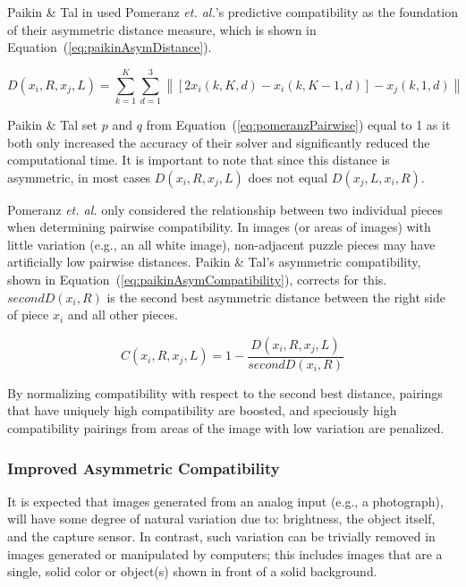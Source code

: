 \documentclass{report}
\def\eref#1{(\ref{#1})}
\newcommand{\norm}[1]{\left\lVert#1\right\rVert}
\begin{document}
Paikin \& Tal in \cite{paikin2015} used Pomeranz \textit{et. al.}'s predictive compatibility as the foundation of their asymmetric distance measure, which is shown in Equation~\eref{eq:paikinAsymDistance}.

\begin{equation} \label{eq:paikinAsymDistance}
D(x_i,R,x_j,L) = \sum_{k=1}^{K}\sum_{d=1}^{3} \norm{[2x_i(k, K, d) - x_i(k, K-1, d)] - x_j(k, 1, d)}
\end{equation}

Paikin \& Tal set $p$ and $q$ from Equation~\eref{eq:pomeranzPairwise} equal to 1 as it both only increased the accuracy of their solver and significantly reduced the computational time.  It is important to note that since this distance is asymmetric, in most cases $D(x_i,R,x_j,L)$ does not equal $D(x_j,L,x_i,R)$.

Pomeranz \textit{et. al.} only considered the relationship between two individual pieces when determining pairwise compatibility.  In images (or areas of images) with little variation (e.g., an all white image), non-adjacent puzzle pieces may have artificially low pairwise distances.  Paikin \& Tal's asymmetric compatibility, shown in Equation~\eref{eq:paikinAsymCompatibility}, corrects for this.  $secondD(x_i,R)$ is the second best asymmetric distance between the right side of piece $x_i$ and all other pieces. 

\begin{equation} \label{eq:paikinAsymCompatibility}
C(x_i,R,x_j,L) = 1 - \frac{D(x_i,R,x_j,L)}{secondD(x_i,R)}
\end{equation}

\noindent
By normalizing compatibility with respect to the second best distance, pairings that have uniquely high compatibility are boosted, and speciously high compatibility pairings from areas of the image with low variation are penalized.

\subsubsection{Improved Asymmetric Compatibility}\label{sec:hammoudehPairwiseAffinity}

It is expected that images generated from an analog input (e.g., a photograph), will have some degree of natural variation due to: brightness, the object itself, and the capture sensor.  In contrast, such variation can be trivially removed in images generated or manipulated by computers; this includes images that are a single, solid color or object(s) shown in front of a solid background.
\end{document}

